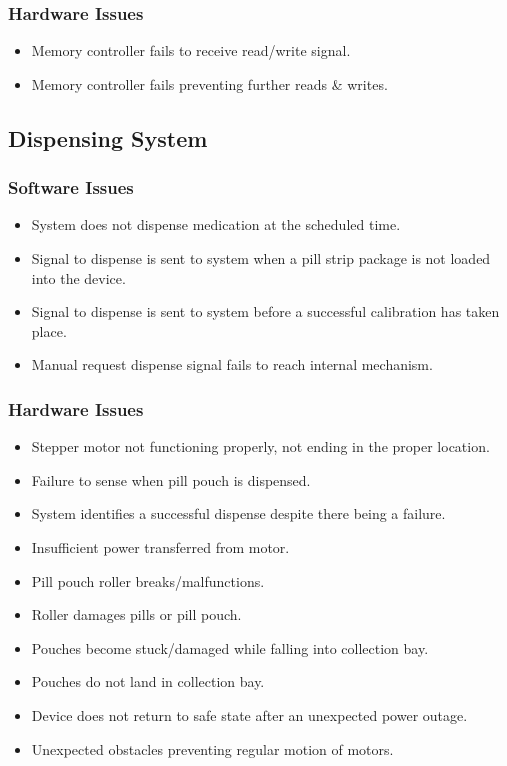 \documentclass[12pt]{article}
\begin{document}
\subsubsection*{Hardware Issues}
\begin{itemize}
\item Memory controller fails to receive read/write signal.
\item Memory controller fails preventing further reads \& writes.
\end{itemize}

\subsection{Dispensing System}
\subsubsection*{Software Issues}
\begin{itemize}
\item System does not dispense medication at the scheduled time.
\item Signal to dispense is sent to system when a pill strip package is not loaded into the device.
\item Signal to dispense is sent to system before a successful calibration has taken place.
\item Manual request dispense signal fails to reach internal mechanism.
\end{itemize}
\subsubsection*{Hardware Issues}
\begin{itemize}
\item Stepper motor not functioning properly, not ending in the proper location.
\item Failure to sense when pill pouch is dispensed.
\item System identifies a successful dispense despite there being a failure.
\item Insufficient power transferred from motor.
\item Pill pouch roller breaks/malfunctions.
\item Roller damages pills or pill pouch.
\item Pouches become stuck/damaged while falling into collection bay.
\item Pouches do not land in collection bay.
\item Device does not return to safe state after an unexpected power outage.
\item Unexpected obstacles preventing regular motion of motors.
\end{itemize}
\end{document}
